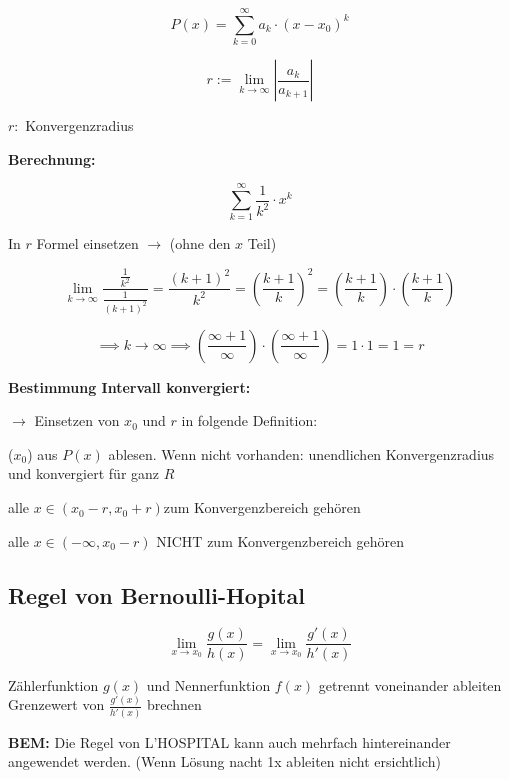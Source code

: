 \begin{multicols*}{3}
    $$P(x) = \sum_{k = 0}^{ \infty }a_k\cdot(x-x_0)^k$$

    {$$r:= \lim_{k \to \infty } |\frac{a_k}{a_{k+1}}| $$}

    {$r:$ Konvergenzradius}

    {\textbf{Berechnung:}}

    {$$\sum^{\infty}_{k=1}{\frac{1}{k^2}\cdot x^k}$$}

    {In $r$ Formel einsetzen $\to$ (ohne den $x$ Teil)}

    {$$ \lim_{k \to \infty} \frac{\frac{1}{k^2}}{\frac{1}{(k+1)^2}} = \frac{(k+1)^2}{k^2} = (\frac{k+1}{k})^2 = (\frac{k+1}{k}) \cdot (\frac{k+1}{k})  $$}

    {$$\implies k \to \infty \implies (\frac{\infty+1}{\infty}) \cdot (\frac{\infty+1}{\infty}) = 1 \cdot 1 = 1  =r$$}

    \textbf{Bestimmung Intervall konvergiert:}

    {$\to$ Einsetzen von $x_0$ und $r$ in folgende Definition:}

    {($x_0$) aus $P(x)$ ablesen. Wenn nicht vorhanden: unendlichen Konvergenzradius und konvergiert für ganz $R$ }


    {alle $x \in (x_0 -r,x_0 + r)$zum Konvergenzbereich gehören }



    {alle $x \in (-\infty,x_0 - r)$ NICHT zum Konvergenzbereich gehören }


    \subsection{Regel von Bernoulli-Hopital}


    $$ \lim_{x \to x_0} \frac{g(x)}{h(x)} = \lim_{x \to x_0} \frac{g'(x)}{h'(x)}$$

    { Zählerfunktion $g(x)$ und Nennerfunktion $f(x)$ getrennt voneinander ableiten}
    \WhiteSpace
    { Grenzewert von $\frac{g'(x)}{h'(x)}$ brechnen}
    \WhiteSpace

    {\textbf{BEM:} Die Regel von L'HOSPITAL kann auch mehrfach hintereinander angewendet werden.}
    {\small(Wenn Lösung nacht 1x ableiten nicht ersichtlich)}
    \mbox{}

\end{multicols*}


